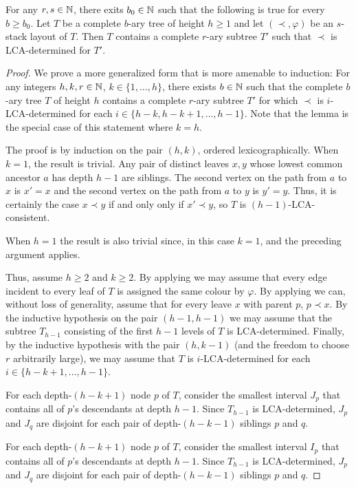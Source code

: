 \documentclass[kpfonts]{patmorin}
\begin{document}
\begin{lem}
  For any $r,s\in\mathbb{N}$, there exits $b_0\in\mathbb{N}$ such that the following is true for every $b\ge b_0$.  Let $T$ be a complete $b$-ary tree of height $h\ge 1$ and let $(\prec,\varphi)$ be an $s$-stack layout of $T$.  Then $T$ contains a complete $r$-ary subtree $T'$ such that $\prec$ is LCA-determined for $T'$.
\end{lem}

\begin{proof}
  We prove a more generalized form that is more amenable to induction:  
  For any integers $h,k,r\in \mathbb{N}$, $k\in\{1,\ldots,h\}$, there exists $b\in\mathbb{N}$ such that the complete $b$-ary tree $T$ of height $h$ contains a complete $r$-ary subtree $T'$ for which $\prec$ is $i$-LCA-determined for each $i\in\{h-k,h-k+1,\ldots,h-1\}$.  Note that the lemma is the special case of this statement where $k=h$.
  
  The proof is by induction on the pair $(h,k)$, ordered lexicographically.
  When $k=1$, the result is trivial.  Any pair of distinct leaves $x,y$ whose lowest common ancestor $a$ has depth $h-1$ are siblings.  The second vertex on the path from $a$ to $x$ is $x'=x$ and the second vertex on the path from $a$ to $y$ is $y'=y$.  Thus, it is certainly the case $x\prec y$ if and only only if $x'\prec y$, so $T$ is $(h-1)$-LCA-consistent.
  
  When $h=1$ the result is also trivial since, in this case $k=1$, and the preceding argument applies.
  
  Thus, assume $h\ge 2$ and $k\ge 2$. By applying  we may assume that every edge incident to every leaf of $T$ is assigned the same colour by $\varphi$.  By applying  we can, without loss of generality, assume that for every leave $x$ with parent $p$, $p\prec x$.  By the inductive hypothesis on the pair $(h-1,h-1)$ we may assume that the subtree $T_{h-1}$ consisting of the first $h-1$ levels of $T$ is LCA-determined.  Finally, by the inductive hypothesis with the pair $(h,k-1)$ (and the freedom to choose $r$ arbitrarily large), we may assume that $T$ is $i$-LCA-determined for each $i\in\{h-k+1,\ldots,h-1\}$. 

  For each depth-$(h-k+1)$ node $p$ of $T$, consider the smallest interval $J_p$ that contains all of $p$'s descendants at depth $h-1$.  Since $T_{h-1}$ is LCA-determined, $J_p$ and $J_q$ are disjoint for each pair of depth-$(h-k-1)$ siblings $p$ and $q$.

  For each depth-$(h-k+1)$ node $p$ of $T$, consider the smallest interval $I_p$ that contains all of $p$'s descendants at depth $h-1$.  Since $T_{h-1}$ is LCA-determined, $J_p$ and $J_q$ are disjoint for each pair of depth-$(h-k-1)$ siblings $p$ and $q$.
  

\end{proof}
\end{document}
